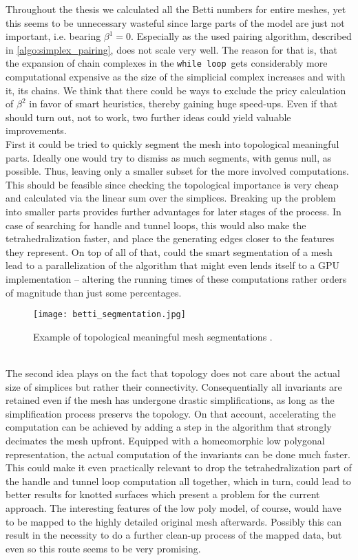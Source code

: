 Throughout the thesis we calculated all the Betti numbers for entire meshes, yet this seems to be unnecessary wasteful since large parts of the model are just not important, i.e. bearing $\beta^{1} = 0$.
Especially as the used pairing algorithm, described in \ref{algo:simplex_pairing}, does not scale very well.
The reason for that is, that the expansion of chain complexes in the \texttt{while loop} \,gets considerably more computational expensive as the size of the simplicial complex  increases and with it, its chains.
We think that there could be ways to exclude the pricy calculation of $\beta^{2}$ in favor of smart heuristics, thereby gaining huge speed-ups.
Even if that should turn out, not to work, two further ideas could yield valuable improvements.\\
First it could be tried to quickly segment the mesh into topological meaningful parts.
Ideally one would try to dismiss as much segments, with genus null, as possible.
Thus, leaving only a smaller subset for the more involved computations.
This should be feasible since checking the topological importance is very cheap and calculated via the linear sum over the simplices.
Breaking up the problem into smaller parts provides further advantages for later stages of the process.
In case of searching for handle and tunnel loops, this would also make the tetrahedralization faster, and place the generating edges closer to the features they represent.
On top of all of that, could the smart segmentation of a mesh lead to a parallelization of the algorithm that might even lends itself to a GPU implementation -- altering the running times of these computations rather orders of magnitude than just some percentages.
\begin{figure}[ht]
\centering
\texttt{[image: betti\_segmentation.jpg]}
\caption{Example of topological meaningful mesh segmentations \citep[][Figure 7 \& 9]{Attene2006}.}
\label{fig:betti_segmentation}
\end{figure}\\
The second idea plays on the fact that topology does not care about the actual size of simplices but rather their connectivity.
Consequentially all invariants are retained even if the mesh has undergone drastic simplifications, as long as the simplification process preservs the topology.
On that account, accelerating the computation can be achieved by adding a step in the algorithm that strongly decimates the mesh upfront.
Equipped with a homeomorphic low polygonal representation, the actual computation of the invariants can be done much faster.
This could make it even practically relevant to drop the tetrahedralization part of the handle and tunnel loop computation all together, which in turn, could lead to better results for knotted surfaces which present a problem for the current approach.
The interesting features of the low poly model, of course, would have to be mapped to the highly detailed original mesh afterwards.
Possibly this can result in the necessity to do a further clean-up process of the mapped data, but even so this route seems to be very promising.


